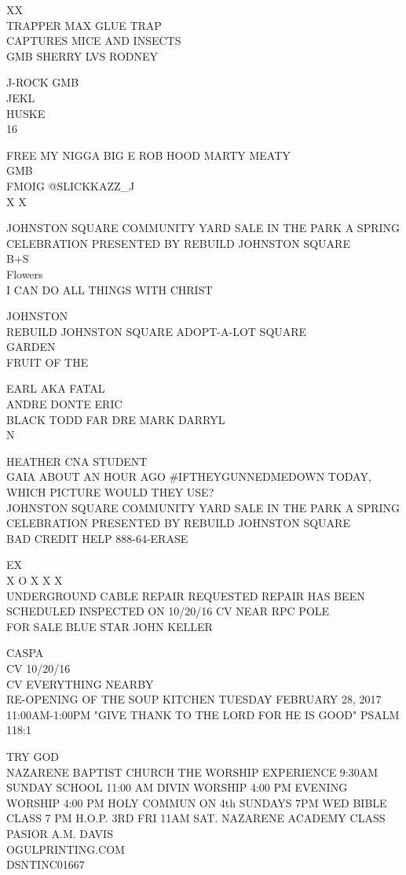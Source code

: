 \documentclass[10pt,letterpaper]{article}
\begin{document}
XX\\
TRAPPER MAX GLUE TRAP\\
CAPTURES MICE AND INSECTS\\
GMB SHERRY LVS RODNEY

J{-}ROCK GMB\\
JEKL\\
HUSKE\\
16

FREE MY NIGGA BIG E ROB HOOD MARTY MEATY\\
GMB\\
FMOIG @SLICKKAZZ\_J\\
X X

JOHNSTON SQUARE COMMUNITY YARD SALE IN THE PARK A SPRING CELEBRATION PRESENTED BY REBUILD JOHNSTON SQUARE\\
B+S\\
Flowers\\
I CAN DO ALL THINGS WITH CHRIST

JOHNSTON\\
REBUILD JOHNSTON SQUARE ADOPT{-}A{-}LOT SQUARE\\
GARDEN\\
FRUIT OF THE

EARL AKA FATAL\\
ANDRE DONTE ERIC\\
BLACK TODD FAR DRE MARK DARRYL\\
N

HEATHER CNA STUDENT\\
GAIA ABOUT AN HOUR AGO \#IFTHEYGUNNEDMEDOWN TODAY, WHICH PICTURE WOULD THEY USE?\\
JOHNSTON SQUARE COMMUNITY YARD SALE IN THE PARK A SPRING CELEBRATION PRESENTED BY REBUILD JOHNSTON SQUARE\\
BAD CREDIT HELP 888{-}64{-}ERASE

EX\\
X O X X X\\
UNDERGROUND CABLE REPAIR REQUESTED REPAIR HAS BEEN SCHEDULED INSPECTED ON 10/20/16 CV NEAR RPC POLE\\
FOR SALE BLUE STAR JOHN KELLER

CASPA\\
CV 10/20/16\\
CV EVERYTHING NEARBY\\
RE{-}OPENING OF THE SOUP KITCHEN TUESDAY FEBRUARY 28, 2017 11:00AM{-}1:00PM "GIVE THANK TO THE LORD FOR HE IS GOOD" PSALM 118:1

TRY GOD\\
NAZARENE BAPTIST CHURCH THE WORSHIP EXPERIENCE 9:30AM SUNDAY SCHOOL 11:00 AM DIVIN WORSHIP 4:00 PM EVENING WORSHIP 4:00 PM HOLY COMMUN ON 4th SUNDAYS 7PM WED BIBLE CLASS 7 PM H.O.P. 3RD FRI 11AM SAT. NAZARENE ACADEMY CLASS PASIOR A.M. DAVIS\\
OGULPRINTING.COM\\
DSNTINC01667
\end{document}
